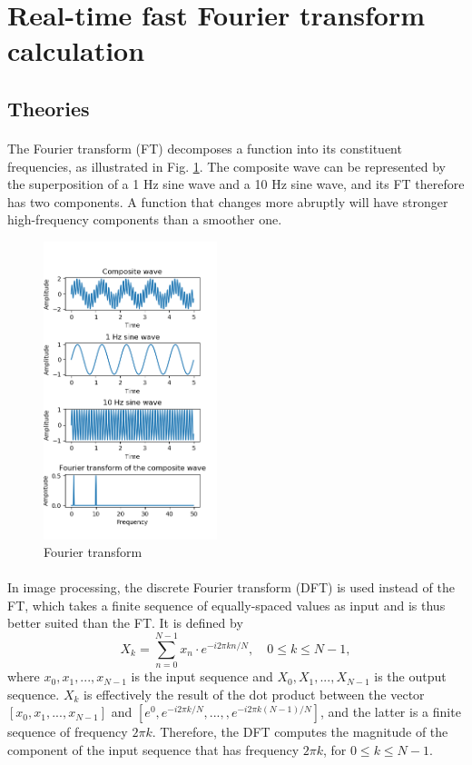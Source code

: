 \documentclass[12pt, twocolumn]{report}
\begin{document}
\section{Real-time fast Fourier transform calculation}
\subsection{Theories}
\paragraph{}
The Fourier transform (FT) decomposes a function into its constituent frequencies, as illustrated in Fig. \ref{FT demonstration}. The composite wave can be represented by the superposition of a 1 Hz sine wave and a 10 Hz sine wave, and its FT therefore has two components. A function that changes more abruptly will have stronger high-frequency components than a smoother one.

\begin{figure}[htbp]
    \centering
    \includegraphics[width=0.45\textwidth]{Figures/FT demonstration.png}
    \caption{Fourier transform}
    \label{FT demonstration}
\end{figure}

\paragraph{}
In image processing, the discrete Fourier transform (DFT) is used instead of the FT, which takes a finite sequence of equally-spaced values as input and is thus better suited than the FT. It is defined by
\begin{equation}
    X_k = \sum_{n=0}^{N-1} x_n \cdot e^{-i2\pi kn/N}, \quad 0 \leq k \leq N-1,
    \label{FT DFT}
\end{equation}
where $x_0,x_1,...,x_{N-1}$ is the input sequence and $X_0,X_1,...,X_{N-1}$ is the output sequence. $X_k$ is effectively the result of the dot product between the vector $[x_0,x_1,...,x_{N-1}]$ and $[e^0,e^{-i2\pi k/N},...,,e^{-i2\pi k(N-1)/N}]$, and the latter is a finite sequence of frequency $2\pi k$. Therefore, the DFT computes the magnitude of the component of the input sequence that has frequency $2\pi k$, for $0 \leq k \leq N-1$.
\end{document}

